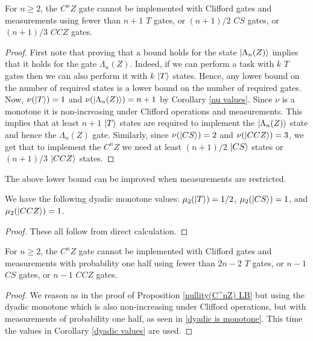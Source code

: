 \documentclass[12pt]{dalthesis}
\begin{document}
\begin{proposition}
\label{nullity(C^nZ) LB}
For $n \geq 2$, the $C^n Z$ gate cannot be implemented with Clifford gates and measurements using fewer than $n+1$ $T$ gates, or $(n+1)/2$ $CS$ gates, or $(n+1)/3$ $CCZ$ gates.
\end{proposition}

\begin{proof}
First note that proving that a bound holds for the state $\ket{\Lambda_n (Z)}$ implies that it holds for the gate $\Lambda_n (Z)$. Indeed, if we can perform a task with $k$ $T$ gates then we can also perform it with $k$ $\ket{T}$ states. Hence, any lower bound on the number of required states is a lower bound on the number of required gates. Now, $\nu (\ket{T}) = 1$ and $\nu (\ket{\Lambda_n (Z)}) = n+1$ by Corollary \ref{nu values}. Since $\nu$ is a monotone it is non-increasing under Clifford operations and measurements. This implies that at least $n+1$ $\ket{T}$ states are required to implement the $\ket{\Lambda_n (Z)}$ state and hence the $\Lambda_n (Z)$ gate. Similarly, since $\nu (\ket{CS}) = 2$ and $\nu (\ket{CCZ}) = 3$, we get that to implement the $C^n Z$ we need at least $(n+1)/2$ $\ket{CS}$ states or $(n+1)/3$ $\ket{CCZ}$ states.
\end{proof}

The above lower bound can be improved when measurements are restricted.

\begin{corollary}
\label{dyadic values}
We have the following dyadic monotone values: $\mu_2 (\ket{T}) = 1/2$, $\mu_2 (\ket{CS}) = 1$, and $\mu_2 (\ket{CCZ}) = 1$.
\end{corollary}
\begin{proof}
These all follow from direct calculation.
\end{proof}

\begin{lemma}
\label{CCZ lowerbound}
For $n \geq 2$, the $C^n Z$ gate cannot be implemented with Clifford gates and measurements with probability one half using fewer than $2n-2$ $T$ gates, or $n-1$ $CS$ gates, or $n-1$ $CCZ$ gates.
\end{lemma}
\begin{proof}
We reason as in the proof of Proposition \ref{nullity(C^nZ) LB} but using the dyadic monotone which is also non-increasing under Clifford operations, but with measurements of probability one half, as seen in \ref{dyadic is monotone}. This time the values in Corollary \ref{dyadic values} are used.
\end{proof}
\end{document}
